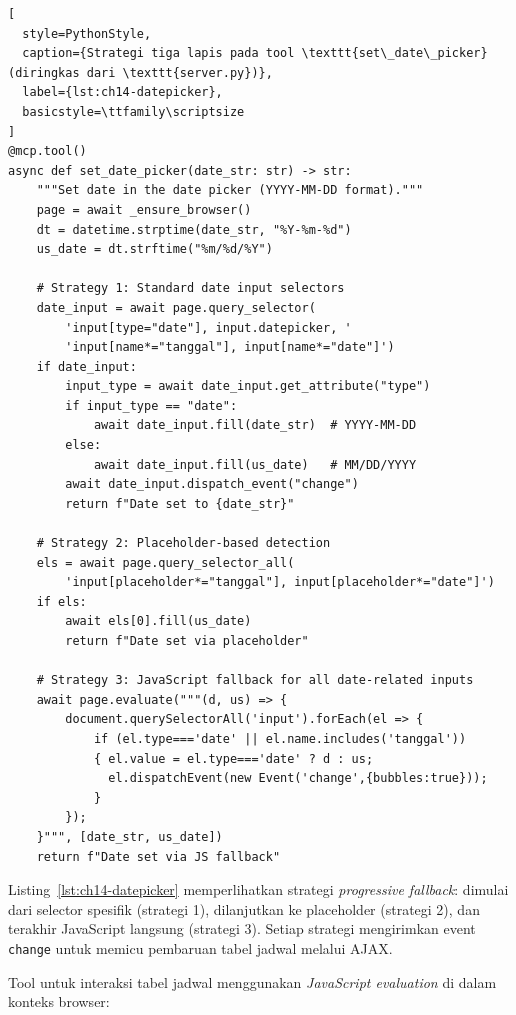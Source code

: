 \begin{lstlisting}[
  style=PythonStyle,
  caption={Strategi tiga lapis pada tool \texttt{set\_date\_picker} (diringkas dari \texttt{server.py})},
  label={lst:ch14-datepicker},
  basicstyle=\ttfamily\scriptsize
]
@mcp.tool()
async def set_date_picker(date_str: str) -> str:
    """Set date in the date picker (YYYY-MM-DD format)."""
    page = await _ensure_browser()
    dt = datetime.strptime(date_str, "%Y-%m-%d")
    us_date = dt.strftime("%m/%d/%Y")

    # Strategy 1: Standard date input selectors
    date_input = await page.query_selector(
        'input[type="date"], input.datepicker, '
        'input[name*="tanggal"], input[name*="date"]')
    if date_input:
        input_type = await date_input.get_attribute("type")
        if input_type == "date":
            await date_input.fill(date_str)  # YYYY-MM-DD
        else:
            await date_input.fill(us_date)   # MM/DD/YYYY
        await date_input.dispatch_event("change")
        return f"Date set to {date_str}"

    # Strategy 2: Placeholder-based detection
    els = await page.query_selector_all(
        'input[placeholder*="tanggal"], input[placeholder*="date"]')
    if els:
        await els[0].fill(us_date)
        return f"Date set via placeholder"

    # Strategy 3: JavaScript fallback for all date-related inputs
    await page.evaluate("""(d, us) => {
        document.querySelectorAll('input').forEach(el => {
            if (el.type==='date' || el.name.includes('tanggal'))
            { el.value = el.type==='date' ? d : us;
              el.dispatchEvent(new Event('change',{bubbles:true}));
            }
        });
    }""", [date_str, us_date])
    return f"Date set via JS fallback"
\end{lstlisting}

\noindent Listing~\ref{lst:ch14-datepicker} memperlihatkan strategi \textit{progressive fallback}: dimulai dari selector spesifik (strategi 1), dilanjutkan ke placeholder (strategi 2), dan terakhir JavaScript langsung (strategi 3). Setiap strategi mengirimkan event \texttt{change} untuk memicu pembaruan tabel jadwal melalui AJAX.

Tool untuk interaksi tabel jadwal menggunakan \textit{JavaScript evaluation} di dalam konteks browser:

